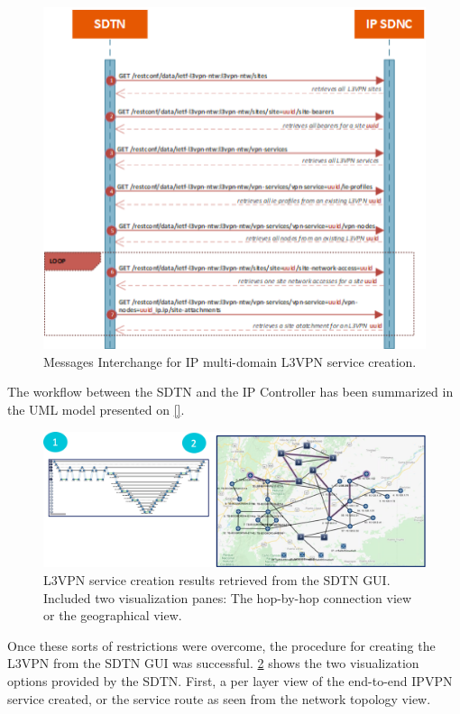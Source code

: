 \documentclass[a4paper,fleqn]{cas-dc}
\begin{document}
\begin{figure}
	\centering
		\includegraphics[width=\linewidth]{figs/l3vpn_workflow.png}
	\caption{Messages Interchange for IP multi-domain L3VPN service creation.}
	\label{FIG:l3vpn_workflow}
\end{figure}


The workflow between the SDTN and the IP Controller has been summarized in the UML model presented on \ref{}.

\begin{figure}
	\centering
		\includegraphics[width=\linewidth]{figs/l3vpn_results.png}
	\caption{L3VPN service creation results retrieved from the SDTN GUI. Included two visualization panes: The hop-by-hop connection view or the geographical view.}
	\label{FIG:l3vpn_results}
\end{figure}

Once these sorts of restrictions were overcome, the procedure for creating the L3VPN from the SDTN GUI was successful. \ref{FIG:l3vpn_results} shows the two visualization options provided by the SDTN. First, a per layer view of the end-to-end IPVPN service created, or the service route as seen from the network topology view.
\end{document}
